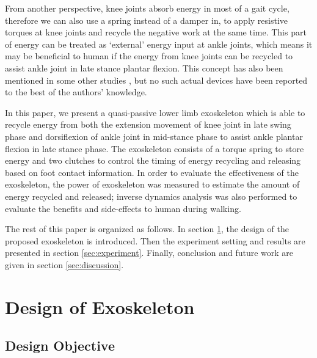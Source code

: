 \documentclass[twocolumn,cleanfoot,10pt]{asme2ej}
\begin{document}
From another perspective, knee joints absorb energy in most of a gait cycle\cite{RN2}, therefore we can also use a spring instead of a damper in\cite{RN3}, to apply resistive torques at knee joints and recycle the negative work at the same time. This part of energy can be treated as ‘external’ energy input at ankle joints, which means it may be beneficial to human if the energy from knee joints can be recycled to assist ankle joint in late stance plantar flexion. This concept has also been mentioned in some other studies\cite{RN3} \cite{RN12}, but no such actual devices have been reported to the best of the authors' knowledge.

In this paper, we present a quasi-passive lower limb exoskeleton which is able to recycle energy from both the extension movement of knee joint in late swing phase and dorsiflexion of ankle joint in mid-stance phase to assist ankle plantar flexion in late stance phase. The exoskeleton consists of a torque spring to store energy and two clutches to control the timing of energy recycling and releasing based on foot contact information. In order to evaluate the effectiveness of the exoskeleton, the power of exoskeleton was measured to estimate the amount of energy recycled and released; inverse dynamics analysis was also performed to evaluate the benefits and side-effects to human during walking.

The rest of this paper is organized as follows. In section \ref{sec:design}, the design of the proposed exoskeleton is introduced. Then the experiment setting and results are presented in section \ref{sec:experiment}. Finally, conclusion and future work are given in section \ref{sec:discussion}.


\section{Design of Exoskeleton}
\label{sec:design}

\subsection{Design Objective}
\label{subsec:Biomechanics}
\end{document}
